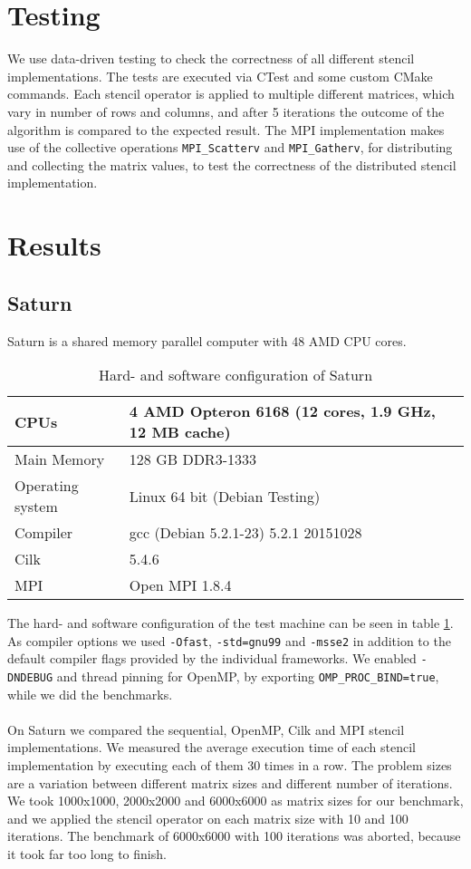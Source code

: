 \documentclass[11pt,a4paper]{article}
\begin{document}
\section{Testing}
We use data-driven testing to check the correctness of all different stencil implementations. The tests are executed via CTest and some custom CMake commands. Each stencil operator is applied to multiple different matrices, which vary in number of rows and columns, and after 5 iterations the outcome of the algorithm is compared to the expected result. The MPI implementation makes use of the collective operations \verb|MPI_Scatterv| and \verb|MPI_Gatherv|, for distributing and collecting the matrix values, to test the correctness of the distributed stencil implementation.

\section{Results}

\subsection{Saturn}
Saturn is a shared memory parallel computer with 48 AMD CPU cores.

\begin{table}[H]
  \label{tab:saturn} 
  \caption{Hard- and software configuration of Saturn}
  \begin{center}
    \begin{tabular}{|l|l|}
      \hline
      CPUs & 4 AMD Opteron 6168 (12 cores, 1.9 GHz, 12 MB cache)\\\hline
      Main Memory & 128 GB DDR3-1333\\\hline
      Operating system & Linux 64 bit (Debian Testing)\\\hline
      Compiler & gcc (Debian 5.2.1-23) 5.2.1 20151028\\\hline
      Cilk & 5.4.6\\\hline
      MPI & Open MPI 1.8.4\\\hline
    \end{tabular}
  \end{center}
\end{table}

The hard- and software configuration of the test machine can be seen in table \ref{tab:saturn}. As compiler options we used \verb|-Ofast|, \verb|-std=gnu99| and \verb|-msse2| in addition to the default compiler flags provided by the individual frameworks. We enabled \verb|-DNDEBUG| and thread pinning for OpenMP, by exporting \verb|OMP_PROC_BIND=true|, while we did the benchmarks.\\
\\
On Saturn we compared the sequential, OpenMP, Cilk and MPI stencil implementations. We measured the average execution time of each stencil implementation by executing each of them 30 times in a row. The problem sizes are a variation between different matrix sizes and different number of iterations. We took 1000x1000, 2000x2000 and 6000x6000 as matrix sizes for our benchmark, and we applied the stencil operator on each matrix size with 10 and 100 iterations. The benchmark of 6000x6000 with 100 iterations was aborted, because it took far too long to finish.
\end{document}
